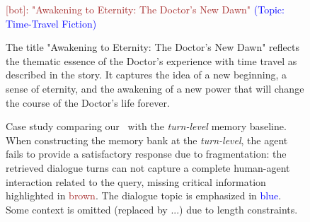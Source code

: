 \begin{figure}[htb]
\begin{tcolorbox}[left=3pt,right=3pt,top=3pt,bottom=3pt,title=\textbf{Retrieved Memory (Ours):}]
\textcolor{brown}{[bot]: "Awakening to Eternity: The Doctor's New Dawn"} \textcolor{blue}{(Topic: Time-Travel Fiction)}
\end{tcolorbox}
\begin{tcolorbox}[left=3pt,right=3pt,top=3pt,bottom=3pt,title=\textbf{Answer (Ours):}]
The title "Awakening to Eternity: The Doctor's New Dawn" reflects the thematic essence of the Doctor's experience with time travel as described in the story. It captures the idea of a new beginning, a sense of eternity, and the awakening of a new power that will change the course of the Doctor's life forever.
\end{tcolorbox}
\caption{Case study comparing our \sysname\ with the \textit{turn-level} memory baseline. When constructing the memory bank at the \textit{turn-level}, the agent fails to provide a satisfactory response due to fragmentation: the retrieved dialogue turns can not capture a complete human-agent interaction related to the query, missing critical information highlighted in \textcolor{brown}{brown}. The dialogue topic is emphasized in \textcolor{blue}{blue}. Some context is omitted (replaced by ...) due to length constraints.}
\label{fig: case_study_segment_vs_turn}
\end{figure}

\newpage

